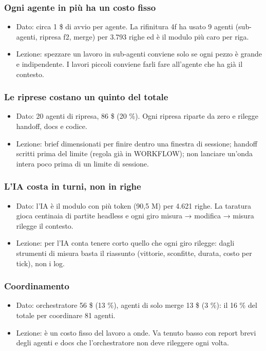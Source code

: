 \documentclass[11pt]{article}
\begin{document}
\subsubsection{Ogni agente in più ha un costo fisso}
\label{sec:orgd8920ce}
\begin{itemize}
\item Dato: circa 1 \$ di avvio per agente. La rifinitura 4f ha usato 9 agenti (sub-agenti, ripresa f2, merge) per
3.793 righe ed è il modulo più caro per riga.
\item Lezione: spezzare un lavoro in sub-agenti conviene solo se ogni pezzo è grande e indipendente. I lavori piccoli
conviene farli fare all'agente che ha già il contesto.
\end{itemize}
\subsubsection{Le riprese costano un quinto del totale}
\label{sec:org58e6128}
\begin{itemize}
\item Dato: 20 agenti di ripresa, 86 \$ (20 \%). Ogni ripresa riparte da zero e rilegge handoff, docs e codice.
\item Lezione: brief dimensionati per finire dentro una finestra di sessione; handoff scritti prima del limite (regola
già in WORKFLOW); non lanciare un'onda intera poco prima di un limite di sessione.
\end{itemize}
\subsubsection{L'IA costa in turni, non in righe}
\label{sec:orgb9278db}
\begin{itemize}
\item Dato: l'IA è il modulo con più token (90,5 M) per 4.621 righe. La taratura gioca centinaia di partite headless e
ogni giro misura → modifica → misura rilegge il contesto.
\item Lezione: per l'IA conta tenere corto quello che ogni giro rilegge: dagli strumenti di misura basta il riassunto
(vittorie, sconfitte, durata, costo per tick), non i log.
\end{itemize}
\subsubsection{Coordinamento}
\label{sec:orgccc3c65}
\begin{itemize}
\item Dato: orchestratore 56 \$ (13 \%), agenti di solo merge 13 \$ (3 \%): il 16 \% del totale per coordinare 81 agenti.
\item Lezione: è un costo fisso del lavoro a onde. Va tenuto basso con report brevi degli agenti e docs che
l'orchestratore non deve rileggere ogni volta.
\end{itemize}
\end{document}
